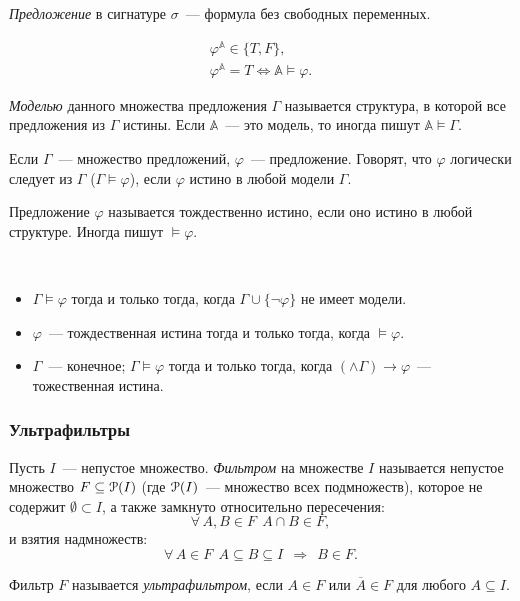 \begin{definition}
    \textit{Предложение} в сигнатуре $\sigma$~— формула без свободных переменных.  

    \begin{equation*}
        \begin{aligned}
            \varphi^{\mathbb{A}} \in \{T, F\}, \\ 
            \varphi^{\mathbb{A}} = T \Longleftrightarrow \mathbb{A} \models \varphi.
        \end{aligned}
    \end{equation*}
\end{definition}

\begin{definition} 
    \textit{Моделью} данного множества предложения $\Gamma$ называется структура, в которой все предложения из $\Gamma$ истины. Если $\mathbb{A}$~— это модель, то иногда пишут $\mathbb{A} \models \Gamma$. 

    Если $\Gamma$~— множество предложений, $\varphi$~— предложение. Говорят, что $\varphi$ логически следует из $\Gamma$ ($\Gamma \models \varphi$), если $\varphi$ истино в любой модели $\Gamma$. 
\end{definition} 

\begin{definition}
    Предложение $\varphi$ называется тождественно истино, если оно истино в любой структуре. Иногда пишут $\models \varphi$. 
\end{definition}

\begin{stat} \ 
    \begin{itemize}
        \item $\Gamma \models \varphi$ тогда и только тогда, когда $\Gamma \cup \{\neg \varphi\}$ не имеет модели. 
        \item $\varphi$~— тождественная истина тогда и только тогда, когда $\models \varphi$. 
        \item $\Gamma$~— конечное; $\Gamma \models \varphi$ тогда и только тогда, когда $(\wedge \Gamma) \to \varphi$~— тожественная истина.
    \end{itemize}
\end{stat} 

\subsubsection{Ультрафильтры}

\begin{definition}
    Пусть $I$~— непустое множество. \textit{Фильтром} на множестве $I$ называется непустое множество $F \subseteq \operatorname{{\EuScript{P}}}(I)$ (где $\operatorname{{\EuScript{P}}}(I)$~— множество всех подмножеств), которое не содержит \(\emptyset \subset I\), а также замкнуто относительно пересечения:
    \[\forall\,A, B \in F\ \ A\cap B \in F,\]
и взятия надмножеств:
    \[\forall\,A \in F\ \ A \subseteq B \subseteq I\ \ \Longrightarrow\ \ B \in F.\]

    Фильтр $F$ называется \textit{ультрафильтром}, если $A \in F$ или $\overline{A} \in F$ для любого $A \subseteq I$. 
\end{definition} 

